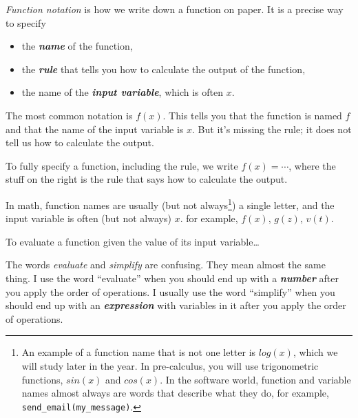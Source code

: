\emph{Function notation}
is how we write down a function on paper.
It is a precise way to specify
\begin{itemize}
    \item the {\bfseries\itshape name} of the function,
    \item the {\bfseries\itshape rule} that tells you how to calculate the output of the function,
    \item the name of the {\bfseries\itshape input variable}, which is often $x$.
\end{itemize}

\begin{tcolorbox}
The most common notation is $f(x)$.
This tells you that the function is named $f$ 
and that the name of the input variable is $x$.
But it's missing the rule; 
it does not tell us how to calculate the output.

To fully specify a function, including the rule, we write $f(x) = \cdots$,
where the stuff on the right is the rule that says how to calculate the output.
\end{tcolorbox}

In math,
function names are usually (but not always\footnote{
    An example of a function name that is not one letter 
    is $log(x)$, which we will study later in the year.
    In pre-calculus, you will use trigonometric functions,
    $sin(x)$ and $cos(x)$.
    In the software world, function and variable names almost always 
    are words that describe what they do, for example,
    \texttt{send\_email(my\_message)}.
}) a single letter,
and the input variable is often (but not always) $x$.
for example, $f(x)$, $g(z)$, $v(t)$.

\begin{myConceptSteps}{To evaluate a function given the value of its input variable\dots}
\end{myConceptSteps}

The words \emph{evaluate} and \emph{simplify} are confusing. 
They mean almost the same thing.
I use the word ``evaluate'' when you should end up with a {\bfseries\itshape number} 
after you apply the order of operations.
I usually use the word ``simplify'' when you should end up with an {\bfseries\itshape expression} with variables in it 
after you apply the order of operations.

